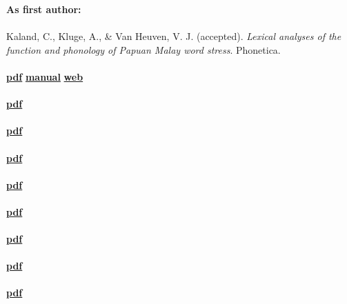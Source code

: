 \documentclass[a4paper,11pt]{article}
\begin{document}
\textbf{As first author:}\\\\
Kaland, C., Kluge, A., \& Van Heuven, V. J. (accepted). \textit{Lexical analyses of the function and phonology of Papuan Malay word stress}. Phonetica.\\\\
 \textcolor{red}{\textbf{\lbrack\href{https://www.cambridge.org/core/services/aop-cambridge-core/content/view/96AFEFCB5395D2DCC3BF8DBDB5F94E7E/S0025100321000049a.pdf/contour-clustering-a-field-data-driven-approach-for-documenting-and-analysing-prototypical-f0-contours.pdf}{pdf}\rbrack}} \textcolor{red}{\textbf{\lbrack\href{https://static.cambridge.org/content/id/urn:cambridge.org:id:article:S0025100321000049/resource/name/S0025100321000049sup001.pdf}{manual}\rbrack}} \textcolor{red}{\textbf{\lbrack\href{http://constantijnkaland.github.io/contourclustering/}{web}\rbrack}}\\\\
 \textcolor{red}{\textbf{\lbrack\href{https://sfb1252.uni-koeln.de/sites/sfb_1252/user_upload/Pdfs_Publikationen/Kaland-Baumann-2020-Demarcating-highlighting-Papuan.pdf}{pdf}\rbrack}}\\\\
 \textcolor{red}{\textbf{\lbrack\href{http://sfb1252.uni-koeln.de/sites/sfb_1252/user_upload/Pdfs_Publikationen/Kaland_-_2020_-_Offline_online_processing.pdf}{pdf}\rbrack}}\\\\
 \textcolor{red}{\textbf{\lbrack\href{https://sfb1252.uni-koeln.de/sites/sfb_1252/user_upload/Pdfs_Publikationen/Kaland_2019_Acoustic_correlates_word.pdf}{pdf}\rbrack}}\\\\
 \textcolor{red}{\textbf{\lbrack\href{http://sfb1252.uni-koeln.de/sites/sfb_1252/user_upload/Pdfs_Publikationen/Kaland_Himmelmann_2019_Repetition_Reduction_Revisited.pdf}{pdf}\rbrack}}\\\\
 \textcolor{red}{\textbf{\lbrack\href{https://journals.sagepub.com/doi/pdf/10.1177/0023830917746551}{pdf}\rbrack}}\\\\
 \textcolor{red}{\textbf{\lbrack\href{http://citeseerx.ist.psu.edu/viewdoc/download?doi=10.1.1.1027.8762&rep=rep1&type=pdf}{pdf}\rbrack}}\\\\
 \textcolor{red}{\textbf{\lbrack\href{https://bridging.uvt.nl/pdf/kaland_swerts_krahmer_jasa_2013.pdf}{pdf}\rbrack}}\\\\
 \textcolor{red}{\textbf{\lbrack\href{https://bridging.uvt.nl/pdf/kaland_krahmer_swerts_phonetica_2013.pdf}{pdf}\rbrack}}\\\
\end{document}
